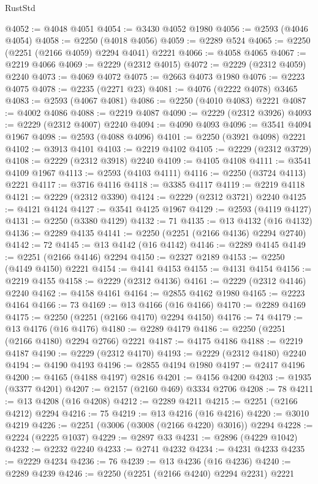 \begin{lexlean}{RustStd}
\begin{coremodule}
{\begin{coremodule}
{{{{{{{{{{{{{{{{{{{{{{{{{{{{{{{{{{{{{{{{{{{{{{{{{{{{{@4052 := @4048 @4051
@4054 := @3430 @4052 @1980
@4056 := @2593 (@4046 @4054)
@4058 := @2250 (@4018 @4056)
@4059 := @2289 @524
@4065 := @2250 (@2251 (@2166 @4059) @2294 @4041) @2221
@4066 := @4058 @4065
@4067 := @2219 @4066
@4069 := @2229 (@2312 @4015)
@4072 := @2229 (@2312 @4059) @2240
@4073 := @4069 @4072
@4075 := @2663 @4073 @1980
@4076 := @2223 @4075
@4078 := @2235 (@2271 @23)
@4081 := @4076 (@2222 @4078) @3465
@4083 := @2593 (@4067 @4081)
@4086 := @2250 (@4010 @4083) @2221
@4087 := @4002 @4086
@4088 := @2219 @4087
@4090 := @2229 (@2312 @3926)
@4093 := @2229 (@2312 @4007) @2240
@4094 := @4090 @4093
@4096 := @3541 @4094 @1967
@4098 := @2593 (@4088 @4096)
@4101 := @2250 (@3921 @4098) @2221
@4102 := @3913 @4101
@4103 := @2219 @4102
@4105 := @2229 (@2312 @3729)
@4108 := @2229 (@2312 @3918) @2240
@4109 := @4105 @4108
@4111 := @3541 @4109 @1967
@4113 := @2593 (@4103 @4111)
@4116 := @2250 (@3724 @4113) @2221
@4117 := @3716 @4116
@4118 := @3385 @4117
@4119 := @2219 @4118
@4121 := @2229 (@2312 @3390)
@4124 := @2229 (@2312 @3721) @2240
@4125 := @4121 @4124
@4127 := @3541 @4125 @1967
@4129 := @2593 (@4119 @4127)
@4131 := @2250 (@3380 @4129)
@4132 := 71
@4135 := @13 @4132 (@16 @4132)
@4136 := @2289 @4135
@4141 := @2250 (@2251 (@2166 @4136) @2294 @2740)
@4142 := 72
@4145 := @13 @4142 (@16 @4142)
@4146 := @2289 @4145
@4149 := @2251 (@2166 @4146) @2294
@4150 := @2327 @2189
@4153 := @2250 (@4149 @4150) @2221
@4154 := @4141 @4153
@4155 := @4131 @4154
@4156 := @2219 @4155
@4158 := @2229 (@2312 @4136)
@4161 := @2229 (@2312 @4146) @2240
@4162 := @4158 @4161
@4164 := @2855 @4162 @1980
@4165 := @2223 @4164
@4166 := 73
@4169 := @13 @4166 (@16 @4166)
@4170 := @2289 @4169
@4175 := @2250 (@2251 (@2166 @4170) @2294 @4150)
@4176 := 74
@4179 := @13 @4176 (@16 @4176)
@4180 := @2289 @4179
@4186 := @2250 (@2251 (@2166 @4180) @2294 @2766) @2221
@4187 := @4175 @4186
@4188 := @2219 @4187
@4190 := @2229 (@2312 @4170)
@4193 := @2229 (@2312 @4180) @2240
@4194 := @4190 @4193
@4196 := @2855 @4194 @1980
@4197 := @2417 @4196
@4200 := @4165 (@4188 @4197) @2816
@4201 := @4156 @4200
@4203 := @1935 (@3377 @4201)
@4207 := @2157 (@2160 @469) @3334 @2706
@4208 := 78
@4211 := @13 @4208 (@16 @4208)
@4212 := @2289 @4211
@4215 := @2251 (@2166 @4212) @2294
@4216 := 75
@4219 := @13 @4216 (@16 @4216)
@4220 := @3010 @4219
@4226 := @2251 (@3006 (@3008 (@2166 @4220) @3016)) @2294
@4228 := @2224 (@2225 @1037)
@4229 := @2897 @33
@4231 := @2896 (@4229 @1042)
@4232 := @2232 @2240
@4233 := @2741 @4232
@4234 := @4231 @4233
@4235 := @2229 @4234
@4236 := 76
@4239 := @13 @4236 (@16 @4236)
@4240 := @2289 @4239
@4246 := @2250 (@2251 (@2166 @4240) @2294 @2231) @2221
}}}}}}}}}}}}}}}}}}}}}}}}}}}}}}}}}}}}}}}}}}}}}}}}}}}}}
\end{coremodule}}
\end{coremodule}
\end{lexlean}
